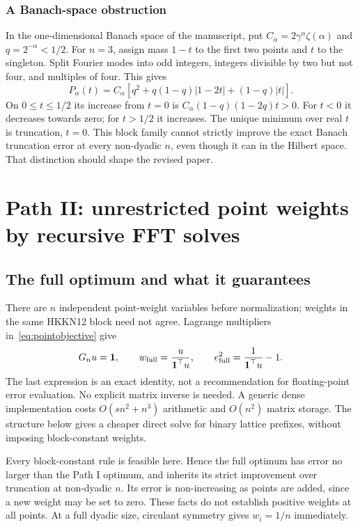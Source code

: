 \documentclass[11pt]{article}
\newcommand{\bbone}{\boldsymbol{1}}
\begin{document}
\subsubsection{A Banach-space obstruction}
In the one-dimensional Banach space of the manuscript, put
$C_\alpha=2\gamma^\alpha\zeta(\alpha)$ and
$q=2^{-\alpha}<1/2$.
For $n=3$, assign mass $1-t$ to the first two points and $t$ to
the singleton. Split Fourier modes into odd integers, integers
divisible by two but not four, and multiples of four. This gives
\begin{equation}\label{eq:banach}
 P_\alpha(t)=C_\alpha
 [q^2+q(1-q)|1-2t|+(1-q)|t|].
\end{equation}
On $0\le t\le1/2$ its increase from $t=0$ is
$C_\alpha(1-q)(1-2q)t>0$.
For $t<0$ it decreases towards zero; for $t>1/2$ it increases.
The unique minimum over real $t$ is truncation, $t=0$.
This block family cannot strictly improve the exact Banach truncation
error at every non-dyadic $n$, even though it can in the Hilbert space.
That distinction should shape the revised paper.

\section{Path II: unrestricted point weights by recursive FFT solves}\label{sec:fftpath}
\subsection{The full optimum and what it guarantees}
There are $n$ independent point-weight variables before normalization;
weights in the same HKKN12 block need not agree. Lagrange multipliers
in~\eqref{eq:pointobjective} give
\begin{equation}\label{eq:fullweights}
 G_nu=\bbone,\qquad
 w_{\rm full}=\frac{u}{\bbone^\top u},\qquad
 e_{\rm full}^2=\frac1{\bbone^\top u}-1.
\end{equation}
The last expression is an exact identity, not a recommendation for
floating-point error evaluation. No explicit matrix inverse is needed.
A generic dense implementation costs $O(sn^2+n^3)$ arithmetic and
$O(n^2)$ matrix storage. The structure below gives a cheaper direct
solve for binary lattice prefixes, without imposing block-constant weights.

Every block-constant rule is feasible here. Hence the full optimum has
error no larger than the Path I optimum, and inherits its strict
improvement over truncation at non-dyadic $n$. Its error is non-increasing
as points are added, since a new weight may be set to zero.
These facts do not establish positive weights at all points.
At a full dyadic size, circulant symmetry gives $w_i=1/n$ immediately.
\end{document}
